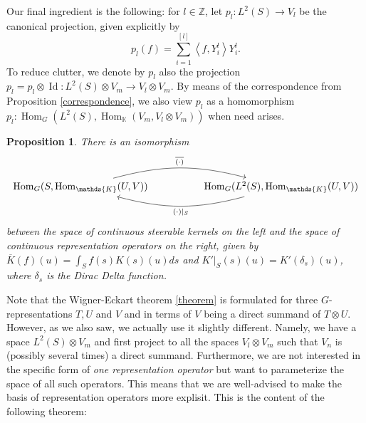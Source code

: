 \documentclass[12pt, a4paper]{article}
\theoremstyle{plain}
\newtheorem{pro}{Proposition}[section]
\theoremstyle{definition}
\theoremstyle{remark}
\newcommand{\Z}{\mathds{Z}}
\newcommand{\K}{\mathds{K}}
\DeclareMathOperator{\Hom}{Hom}
\DeclareMathOperator{\Id}{Id}
\begin{document}
Our final ingredient is the following: for $l \in \Z$, let $p_l: L^2(S) \to V_l$ be the canonical projection, given explicitly by
\begin{equation*}
p_l(f) = \sum_{i = 1}^{[l]} \left\langle  f, Y^l_i \right\rangle Y^l_i.
\end{equation*}
To reduce clutter, we denote by $p_l$ also the projection $p_l = p_l \otimes \Id: L^2(S) \otimes V_m \to V_l \otimes V_m$. By means of the correspondence from Proposition \ref{correspondence}, we also view $p_l$ as a homomorphism $p_l: \Hom_G(L^2(S), \Hom_\K(V_m, V_l \otimes V_m))$ when need arises.

\begin{pro}\label{steerable kernels = representation operators}
There is an isomorphism
\begin{equation*}
\begin{tikzcd}
\Hom_G(S, \Hom_{\K}(U, V)) \ar[rr, bend left = 15, "\overline{(\cdot)}"] & & \Hom_G(L^2(S), \Hom_{\K}(U, V)) \ar[ll, bend left = 15, "(\cdot)|_{S}"]
\end{tikzcd}
\end{equation*}
between the space of continuous steerable kernels on the left and the space of continuous representation operators on the right, given by $\overline{K}(f)(u) = \int_{S}f(s)K(s)(u)ds$ and $K'|_{S}(s)(u) = K'(\delta_s)(u)$, where $\delta_s$ is the Dirac Delta function.
\end{pro}

Note that the Wigner-Eckart theorem \ref{theorem} is formulated for three $G$-representations $T, U$ and $V$ and in terms of $V$ being a direct summand of $T \otimes U$. However, as we also saw, we actually use it slightly different. Namely, we have a space $L^2(S) \otimes V_m$ and first project to all the spaces $V_l \otimes V_m$ such that $V_n$ is (possibly several times) a direct summand. Furthermore, we are not interested in the specific form of \emph{one representation operator} but want to parameterize the space of all such operators. This means that we are well-advised to make the basis of representation operators more explisit. This is the content of the following theorem:
\end{document}
